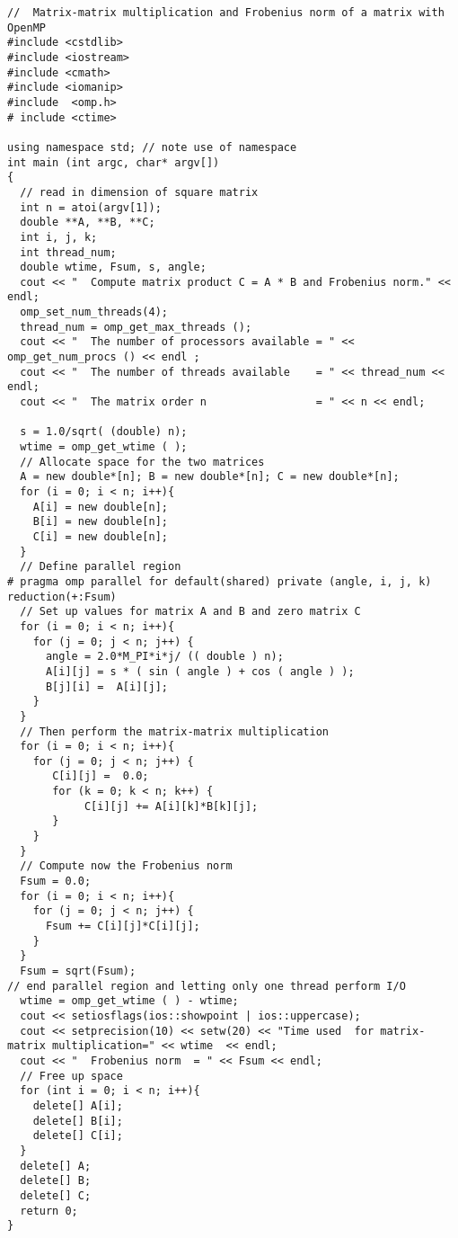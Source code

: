 \begin{verbatim}
//  Matrix-matrix multiplication and Frobenius norm of a matrix with OpenMP
#include <cstdlib>
#include <iostream>
#include <cmath>
#include <iomanip>
#include  <omp.h>
# include <ctime>

using namespace std; // note use of namespace
int main (int argc, char* argv[])
{
  // read in dimension of square matrix
  int n = atoi(argv[1]);
  double **A, **B, **C;
  int i, j, k;
  int thread_num;
  double wtime, Fsum, s, angle;
  cout << "  Compute matrix product C = A * B and Frobenius norm." << endl;
  omp_set_num_threads(4);
  thread_num = omp_get_max_threads ();
  cout << "  The number of processors available = " << omp_get_num_procs () << endl ;
  cout << "  The number of threads available    = " << thread_num <<  endl;
  cout << "  The matrix order n                 = " << n << endl;

  s = 1.0/sqrt( (double) n);
  wtime = omp_get_wtime ( );
  // Allocate space for the two matrices
  A = new double*[n]; B = new double*[n]; C = new double*[n];
  for (i = 0; i < n; i++){
    A[i] = new double[n];
    B[i] = new double[n];
    C[i] = new double[n];
  }
  // Define parallel region
# pragma omp parallel for default(shared) private (angle, i, j, k) reduction(+:Fsum)
  // Set up values for matrix A and B and zero matrix C
  for (i = 0; i < n; i++){
    for (j = 0; j < n; j++) {
      angle = 2.0*M_PI*i*j/ (( double ) n);
      A[i][j] = s * ( sin ( angle ) + cos ( angle ) );
      B[j][i] =  A[i][j];
    }
  }
  // Then perform the matrix-matrix multiplication
  for (i = 0; i < n; i++){
    for (j = 0; j < n; j++) {
       C[i][j] =  0.0;    
       for (k = 0; k < n; k++) {
            C[i][j] += A[i][k]*B[k][j];
       }
    }
  }
  // Compute now the Frobenius norm
  Fsum = 0.0;
  for (i = 0; i < n; i++){
    for (j = 0; j < n; j++) {
      Fsum += C[i][j]*C[i][j];
    }
  }
  Fsum = sqrt(Fsum);
// end parallel region and letting only one thread perform I/O
  wtime = omp_get_wtime ( ) - wtime;
  cout << setiosflags(ios::showpoint | ios::uppercase);
  cout << setprecision(10) << setw(20) << "Time used  for matrix-matrix multiplication=" << wtime  << endl;
  cout << "  Frobenius norm  = " << Fsum << endl;
  // Free up space
  for (int i = 0; i < n; i++){
    delete[] A[i];
    delete[] B[i];
    delete[] C[i];
  }
  delete[] A;
  delete[] B;
  delete[] C;
  return 0;
}



\end{verbatim}

